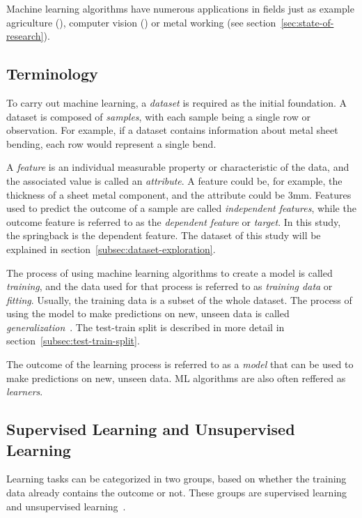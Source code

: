 Machine learning algorithms have numerous applications in fields just as example agriculture (\cite{
    yoosefzadeh2021application}), computer vision (\cite{hu2020voronoi}) or metal working
(see section~\ref{sec:state-of-research}).

\subsection{Terminology}\label{subsec:terminology}
To carry out machine learning, a \textit{dataset} is required as the initial foundation.
A dataset is composed of \textit{samples}, with each sample being a single row or observation.
For example, if a dataset contains information about metal sheet bending, each row would represent a single bend.

A \textit{feature} is an individual measurable property or characteristic of the data, and the associated value is
called
an \textit{attribute}.
A feature could be, for example, the thickness of a sheet metal component, and the attribute could be 3mm.
Features used to predict the outcome of a sample are called \textit{independent features}, while the outcome feature is
referred to as the \textit{dependent feature} or \textit{target}. In this study, the springback is the dependent
feature.
The dataset of this study will be explained in section~\ref{subsec:dataset-exploration}.

The process of using machine learning algorithms to create a model is called \textit{training}, and the data used for
that process is referred to as \textit{training data} or \textit{fitting}.
Usually, the training data is a subset of the whole dataset.
The process of using the model to make predictions on new, unseen data is called
\textit{generalization}~\cite[p. 35]{muller_introductionmachinelearning_2016}.
The test-train split is described in more detail in section~\ref{subsec:test-train-split}.

The outcome of the learning process is referred to as a \textit{model} that can be used to make predictions on new,
unseen data.
\ac{ML} algorithms are also often reffered as \textit{learners}.

\subsection{Supervised Learning and Unsupervised Learning}\label{subsec:supervised-learning}
Learning tasks can be categorized in two groups, based on whether the training data already contains the outcome or not.
These groups are supervised learning and unsupervised learning~\cite[p. 4]{zhou_machinelearning_2021}.


